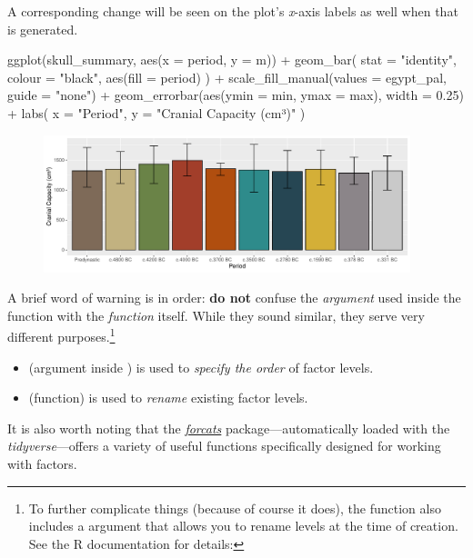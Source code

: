 \clearpage

\noindent
A corresponding change will be seen on the plot's \textit{x}-axis labels as well when that is generated.

\begin{inR}
ggplot(skull_summary, aes(x = period, y = m)) +
  geom_bar(
    stat = "identity",
    colour = "black",
    aes(fill = period)
  ) +
  scale_fill_manual(values = egypt_pal, guide = "none") +
  geom_errorbar(aes(ymin = min, ymax = max), width = 0.25) +
  labs(
    x = "Period",
    y = "Cranial Capacity (cm³)"
  )
\end{inR}

\vspace{2em}

\begin{figure}[H]
\includegraphics[width = 0.95\textwidth]{graphics/ch3Figs/bar_7.pdf}
\end{figure}

A brief word of warning is in order: \textbf{do not} confuse the  \textit{argument} used inside the  function with the  \textit{function} itself. While they sound similar, they serve very different purposes.\footnote{To further complicate things (because of course it does), the  function also includes a  argument that allows you to rename levels at the time of creation. See the R documentation for details: }

\begin{itemize}
    \item {} (argument inside ) is used to \textit{specify the order} of factor levels.
    \item {} (function) is used to \textit{rename} existing factor levels.
\end{itemize}

\noindent
It is also worth noting that the \href{https://forcats.tidyverse.org/}{\textit{forcats}} package—automatically loaded with the \textit{tidyverse}—offers a variety of useful functions specifically designed for working with factors.

